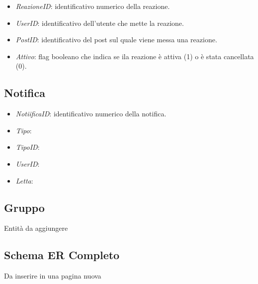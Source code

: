 \documentclass[paper=a4, fontsize=11pt,x11names]{report}
\newcommand{\key}[1]{\underline{#1}}
\begin{document}
\begin{itemize}
\item \textit{ReazioneID}: identificativo numerico della reazione.
\item \textit{UserID}: identificativo dell'utente che mette la reazione.
\item \textit{PostID}: identificativo del post sul quale viene messa una reazione.
\item \textit{Attivo}: flag booleano che indica se ila reazione è attiva (1) o è stata cancellata (0).
\end{itemize}

\subsection{Notifica}

\centering
\vspace{0.5cm}
\vspace{0.5cm}

\begin{itemize}
\item \textit{NotiificaID}: identificativo numerico della notifica.
\item \textit{Tipo}:
\item \textit{TipoID}:
\item \textit{UserID}:
\item \textit{Letta}:
\end{itemize}

\subsection{Gruppo}
Entità da aggiungere

\subsection{Schema ER Completo}
Da inserire in una pagina nuova
\end{document}
